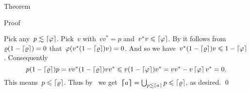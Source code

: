 \documentclass[b]{subfiles}
\begin{document}
\begin{parsec}
\begin{point}{Theorem}
\begin{point}{Proof}
\begin{point}
Pick any~$p \lesssim \left\lceil\varphi\right\rceil$.
Pick~$v$ with~$vv^* = p$ and~$v^*v \leqslant \left\lceil\varphi\right\rceil$.
By 
it follows from~$\varrho(1-\left\lceil\varrho\right\rceil) = 0$
that~$\varphi(v^* (1-\left\lceil\varrho\right\rceil)v)=0$.
And so we have~$v^* (1-\left\lceil\varrho\right\rceil)v \leqslant 1-\left\lceil\varphi\right\rceil$.
Consequently
\begin{equation*}
p (1-\left\lceil\varrho\right\rceil) p
    =    vv^* (1 - \left\lceil\varrho\right\rceil) vv^*
    \leqslant v (1- \left\lceil\varphi\right\rceil) v^*
    = vv^* - v \left\lceil\varphi\right\rceil v^* = 0.
\end{equation*}
This means~$p \leqslant \left\lceil\varrho\right\rceil$.
Thus by~
we get~$\left\lceil\!\!\left\lceil a\right\rceil\!\!\right\rceil = \bigcup_{p \lesssim \left\lceil a\right\rceil} p \leqslant \left\lceil\varrho\right\rceil$,
as desired. \qed
\end{point}
\end{point}
\end{point}
\end{parsec}
\end{document}
